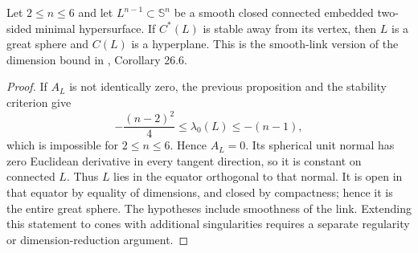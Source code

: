 \begin{theorem}\label{thm:simons-smooth-link-cones}
Let $2\leq n\leq6$ and let $L^{n-1}\subset\mathbb S^n$ be a smooth closed connected embedded two-sided minimal hypersurface. If $C^*(L)$ is stable away from its vertex, then $L$ is a great sphere and $C(L)$ is a hyperplane. This is the smooth-link version of the dimension bound in \cite{ChMin}, Corollary 26.6.
\end{theorem}
\begin{proof}
If $A_L$ is not identically zero, the previous proposition and the stability criterion give
\[
 -\frac{(n-2)^2}{4}\leq\lambda_0(L)\leq-(n-1),
\]
which is impossible for $2\leq n\leq6$. Hence $A_L=0$. Its spherical unit normal has zero Euclidean derivative in every tangent direction, so it is constant on connected $L$. Thus $L$ lies in the equator orthogonal to that normal. It is open in that equator by equality of dimensions, and closed by compactness; hence it is the entire great sphere. The hypotheses include smoothness of the link. Extending this statement to cones with additional singularities requires a separate regularity or dimension-reduction argument.
\end{proof}
